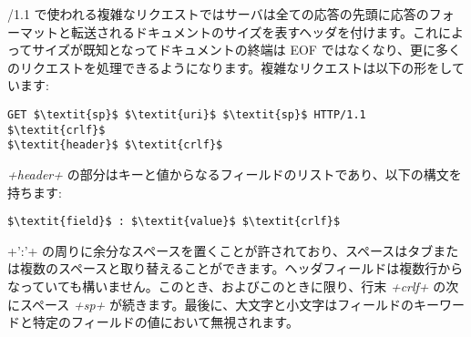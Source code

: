\http/1.1 で使われる複雑なリクエストではサーバは全ての応答の先頭に応答のフォーマットと転送されるドキュメントのサイズを表すヘッダを付けます。これによってサイズが既知となってドキュメントの終端は EOF ではなくなり、更に多くのリクエストを処理できるようになります。複雑なリクエストは以下の形をしています:
%
\begin{lstlisting}
GET $\textit{sp}$ $\textit{uri}$ $\textit{sp}$ HTTP/1.1 $\textit{crlf}$
$\textit{header}$ $\textit{crlf}$
\end{lstlisting}
%
\textit{\ml+header+} の部分はキーと値からなるフィールドのリストであり、以下の構文を持ちます:
%
\begin{lstlisting}
$\textit{field}$ : $\textit{value}$ $\textit{crlf}$
\end{lstlisting}
%
\ml+':'+ の周りに余分なスペースを置くことが許されており、スペースはタブまたは複数のスペースと取り替えることができます。ヘッダフィールドは複数行からなっていても構いません。このとき、およびこのときに限り、行末 \textit {\ml+crlf+} の次にスペース \textit{\ml+sp+} が続きます。最後に、大文字と小文字はフィールドのキーワードと特定のフィールドの値において無視されます。

